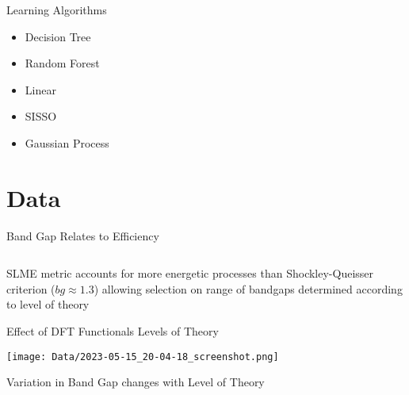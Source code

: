 \documentclass[10pt, aspectratio=169, presentation]{beamer}
\begin{document}
\begin{frame}[label={sec:org6e7e229}]{Learning Algorithms}
\begin{itemize}
\item Decision Tree
\item Random Forest
\item Linear
\item SISSO
\item Gaussian Process
\end{itemize}
\end{frame}

\section{Data}
\label{sec:orgfac9444}
\begin{frame}[label={sec:org6498f75}]{Band Gap Relates to Efficiency}
\begin{columns}
\begin{column}{0.5\columnwidth}
 
\begin{center}

\end{center}
\end{column}

\begin{column}{0.5\columnwidth}
 
\begin{center}

\end{center}
\end{column}
\end{columns}

SLME metric accounts for more energetic processes than
Shockley-Queisser criterion (\(bg \approx 1.3\)) allowing selection on range
of bandgaps determined according to level of theory\autocite[p.1]{yu-2012-ident-poten}
\end{frame}

\begin{frame}[label={sec:org6f1475a}]{Effect of DFT Functionals Levels of Theory}
\begin{center}
\texttt{[image: Data/2023-05-15\_20-04-18\_screenshot.png]}
\end{center}
\end{frame}

\begin{frame}[label={sec:org5670c66}]{Variation in Band Gap changes with Level of Theory}
 
\begin{center}

\end{center}
\end{frame}
\end{document}
